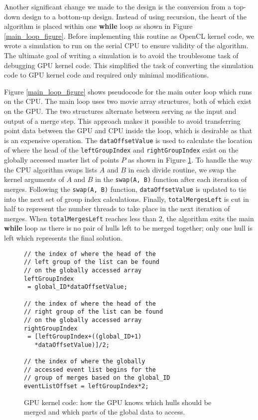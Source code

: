 \documentclass{article}
\begin{document}
Another significant change we made to the design is the conversion from a top-down design to a bottom-up design. Instead of using recursion, the heart of the algorithm is placed within one \textbf{while} loop as shown in Figure \ref{main_loop_figure}. Before implementing this routine as OpenCL kernel code, we wrote a simulation to run on the serial CPU to ensure validity of the algorithm. The ultimate goal of writing a simulation is to avoid the troublesome task of debugging GPU kernel code. This simplified the task of converting the simulation code to GPU kernel code and required only minimal modifications.

Figure \ref{main_loop_figure} shows pseudocode for the main outer loop which runs on the CPU. The main loop uses two movie array structures, both of which exist on the GPU. The two structures alternate between serving as the input and output of a merge step. This approach makes it possible to avoid transferring point data between the GPU and CPU inside the loop, which is desirable as that is an expensive operation. The \texttt{dataOffsetValue} is used to calculate the location of where the head of the \texttt{leftGroupIndex} and \texttt{rightGroupIndex} exist on the globally accessed master list of points $P$ as shown in Figure \ref{kernel_variables}. To handle the way the CPU algorithm swaps lists $A$ and $B$ in each divide routine, we swap the kernel arguments of $A$ and $B$ in the \texttt{swap(A, B)} function after each iteration of merges. Following the \texttt{swap(A, B)} function, \texttt{dataOffsetValue} is updated to tie into the next set of group index calculations. Finally, \texttt{totalMergesLeft} is cut in half to represent the number threads to take place in the next iteration of merges. When \texttt{totalMergesLeft} reaches less than 2, the algorithm exits the main \textbf{while} loop as there is no pair of hulls left to be merged together; only one hull is left which represents the final solution.

\begin{figure}
\begin{lstlisting}
// the index of where the head of the 
// left group of the list can be found 
// on the globally accessed array
leftGroupIndex 
 = global_ID*dataOffsetValue;

// the index of where the head of the 
// right group of the list can be found 
// on the globally accessed array
rightGroupIndex 
 = [leftGroupIndex+((global_ID+1) 
   *dataOffsetValue)]/2;

// the index of where the globally
// accessed event list begins for the
// group of merges based on the global_ID
eventListOffset = leftGroupIndex*2;
\end{lstlisting}
\caption{GPU kernel code: how the GPU knows which hulls should be merged and which parts of the global data to access.}
\label{kernel_variables}
\end{figure}
\end{document}
